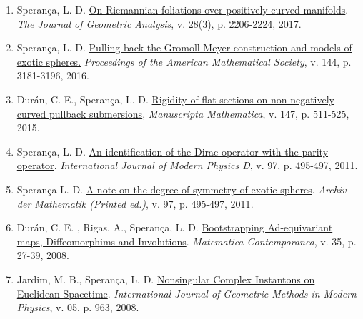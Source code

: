 \documentclass[10pt]{article}
\begin{document}
\begin{enumerate}
		
		
		\item Sperança, L. D. \href{https://link.springer.com/article/10.1007/s12220-017-9901-5}{On Riemannian foliations over positively curved manifolds}. {\textit{The Journal of Geometric Analysis}, v. 28(3), p. 2206-2224, 2017}.
		
		
		
		\item Sperança, L. D. \href{https://www.ams.org/journals/proc/2016-144-07/S0002-9939-2015-12945-0/home.html}{Pulling back the Gromoll-Meyer construction and models of exotic spheres.} {\textit{Proceedings of the American Mathematical Society}, v. 144, p. 3181-3196, 2016}.
		
		
				\item Durán, C. E., Sperança, L. D. \href{https://link.springer.com/article/10.1007/s00229-015-0731-0}{Rigidity of flat sections on non-negatively curved pullback submersions}, {\textit{Manuscripta Mathematica}, v. 147, p. 511-525, 2015}.
		    \vspace{.1 in}
		
		
				\item Sperança, L. D. \href{https://www.worldscientific.com/doi/10.1142/S0218271814440039}{An identification of the Dirac operator with the parity operator}. { \textit{International Journal of Modern Physics D},  v. 97, p. 495-497, 2011}.
		    \vspace{.1 in}
		
		
		
				\item Sperança L. D. \href{https://link.springer.com/article/10.1007/s00013-011-0317-3}{A note on the degree of symmetry of exotic spheres}. {\textit{Archiv der Mathematik (Printed ed.)},  v. 97, p. 495-497, 2011}.
		    \vspace{.1 in}  	  
		
		
				\item Durán, C. E. , Rigas, A., Sperança, L. D.  \href{https://www.mat.unb.br/~matcont/35_2.pdf}{Bootstrapping Ad-equivariant maps, Diffeomorphims and Involutions}. {\textit{Matematica Contemporanea},  v. 35, p. 27-39, 2008}.
		    \vspace{.1 in}
		
				\item Jardim, M. B., Sperança, L. D. \href{https://www.worldscientific.com/doi/10.1142/S0219887808003132}{Nonsingular Complex Instantons on Euclidean Spacetime}. {\textit{International Journal of Geometric Methods in Modern Physics}, v. 05, p. 963, 2008}.
		
		
		
		
	\end{enumerate}
	
\end{document}
